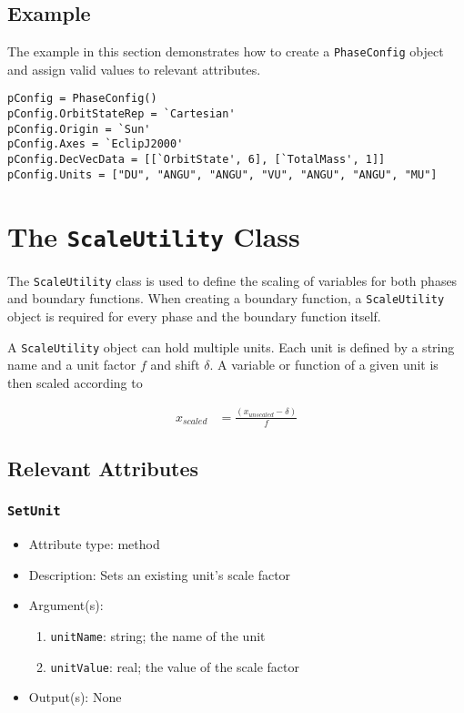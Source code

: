 \documentclass[]{article}
\begin{document}
\subsection{Example}

The example in this section demonstrates how to create a \texttt{PhaseConfig} object and assign valid values to relevant attributes.

\begin{verbatim}
pConfig = PhaseConfig()
pConfig.OrbitStateRep = `Cartesian'
pConfig.Origin = `Sun'
pConfig.Axes = `EclipJ2000'
pConfig.DecVecData = [[`OrbitState', 6], [`TotalMass', 1]]
pConfig.Units = ["DU", "ANGU", "ANGU", "VU", "ANGU", "ANGU", "MU"]
\end{verbatim}

\section{The \texttt{ScaleUtility} Class}
\label{sec:scaleUtility}

The \texttt{ScaleUtility} class is used to define the scaling of variables for both phases and boundary functions. When creating a boundary function, a \texttt{ScaleUtility} object is required for every phase and the boundary function itself.

A \texttt{ScaleUtility} object can hold multiple units. Each unit is defined by a string name and a unit factor $f$ and shift $\delta$. A variable or function of a given unit is then scaled according to

\begin{align}
x_{scaled} &= \frac{\left( x_{unscaled} - \delta \right)}{f}
\end{align}

\subsection{Relevant Attributes}

\subsubsection{\texttt{SetUnit}}

\begin{itemize}
	\item Attribute type: method
	\item Description: Sets an existing unit's scale factor
	\item Argument(s):
	\begin{enumerate}
		\item \texttt{unitName}: string; the name of the unit
		\item \texttt{unitValue}: real; the value of the scale factor
	\end{enumerate}
	\item Output(s): None
\end{itemize}
\end{document}
